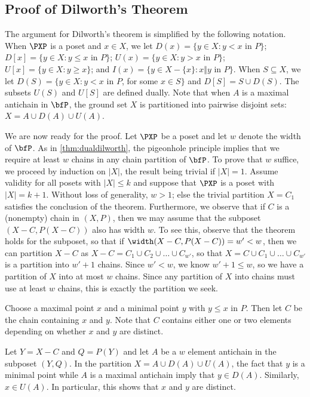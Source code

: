 \subsection{Proof of Dilworth's Theorem}

The argument for Dilworth's theorem is simplified by the 
following notation. When $\PXP$ is a poset and $x\in X$, we let $D(x)=\{y\in 
X:y<x \text{ in }P\}$; $D[x]=\{y\in X:y\le x\text{ in }P\}$; $U(x)=\{y\in X:y>x
\text{ in }P\}$; $U[x]=\{y\in X:y\ge x\}$; and $I(x)=\{y\in X-\{x\}:x\Vert y
\text{ in }P\}$. When $S\subseteq  X$, we let $D(S)=
\{y\in X:y<x$ in $P$, for some $x\in S\}$ and $D[S]=S\cup D(S)$. The
subsets $U(S)$ and $U[S]$ are defined dually.  Note that when 
$A$ is a maximal antichain in $\bfP$, the ground set $X$ is
partitioned into pairwise disjoint sets:\quad $X=A\cup D(A)\cup U(A)$.

We are now ready for the proof.  Let $\PXP$ be a poset and let $w$ denote
the width of $\bfP$.
As in \autoref{thm:dualdilworth}, the pigeonhole principle implies
that we require at least $w$ chains in any chain partition of
$\bfP$. To prove that $w$ suffice, we
proceed by induction on $|X|$, the result being trivial if
$|X|=1$. Assume validity for all posets with $|X|\le k$ and suppose
that $\PXP$ is a poset with $|X|=k+1$. Without loss of generality,
$w>1$; else the trivial partition $X=C_1$ satisfies the
conclusion of the theorem. Furthermore, we observe that if $C$ is a
(nonempty) chain in $(X,P)$, then we may assume that the subposet
$(X-C,P(X-C))$ also has width $w$. To see this, observe that the
theorem holds for the subposet, so that if
$\width(X-C,P(X-C))=w'<w$, then we can partition $X-C$ as
$X-C=C_1\cup C_2\cup\dots\cup C_{w'}$, so that $X=C\cup
C_1\cup\dots\cup C_{w'}$ is a partition into $w'+1$ chains. Since
$w'<w$, we know $w'+1\le w$, so we have a partition of $X$ into at
most $w$ chains. Since any partition of $X$ into chains must use at
least $w$ chains, this is exactly the partition we seek.

Choose a maximal point $x$ and a minimal point $y$ with $y\le x$ in
$P$. Then let $C$ be the chain containing $x$ and $y$. Note that
$C$ contains either one or two elements depending on whether $x$
and $y$ are distinct.

Let $Y=X-C$ and  $Q=P(Y)$ and let $A$ be a $w$ element antichain
in the  subposet $(Y,Q)$.  In the partition $X=A\cup D(A)\cup U(A)$, the
fact that $y$ is a minimal point while $A$ is a maximal
antichain imply that $y\in D(A)$.  Similarly, $x\in U(A)$.  In particular,
this shows that $x$ and $y$ are distinct.

